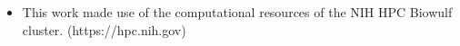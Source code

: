 \documentclass[final]{beamer}
\newlength{\onecolwid}
\renewcommand{\emph}[1]{{\color{nibib2} #1}}
\begin{document}
\begin{frame}[t]
\begin{columns}[t]
\begin{column}{\onecolwid}
    \begin{tcolorbox}[title=References]
        \nocite{GuayDesigning2018}
        \nocite{GuayTwo2019}
        
        
        
    \end{tcolorbox}

    \begin{tcolorbox}[title=Acknowledgements]
        \begin{itemize}
            
            \item This work made use of the computational resources of the NIH HPC Biowulf cluster. (https://hpc.nih.gov)
            
        \end{itemize}
    \end{tcolorbox}
    
    
\end{column}

\end{columns}

\end{frame}
\end{document}
